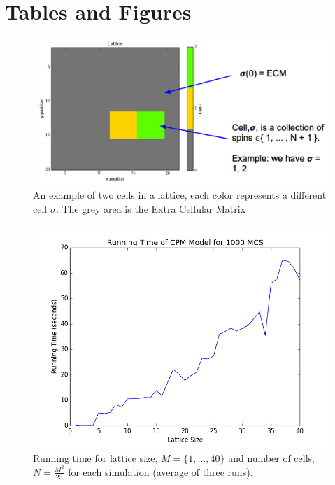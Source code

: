 \documentclass[12pt]{article}
\begin{document}
\pagebreak
\section{Tables and Figures}

\begin{figure}[H]
	\centering
	\includegraphics[scale=0.5]{img/basic}
	\caption{An example of two cells in a lattice, each color represents a different cell $\sigma$. The grey area is the Extra Cellular Matrix}
	\label{basic}
\end{figure}

\begin{figure}[H]
	\centering
	\includegraphics[scale=0.5]{img/runningtime}
	\caption{Running time for lattice size, $M =\{1,\ldots, 40\}$ and number of cells, $N=\frac{M^2}{25}$ for each simulation (average of three runs).}
	\label{runningtime}
\end{figure}

\pagebreak
\end{document}

